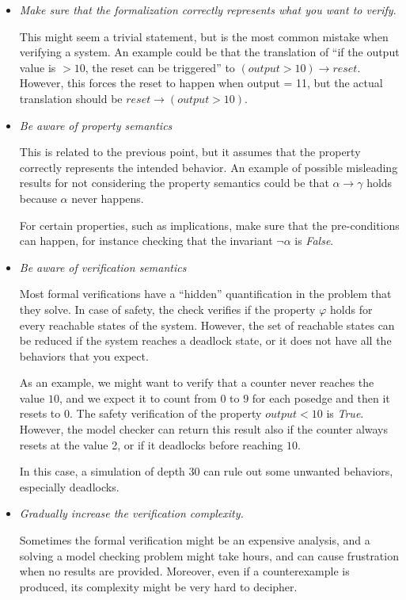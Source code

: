 \documentclass{article}
\theoremstyle{definition}
\begin{document}
\begin{itemize}
\item \textit{Make sure that the formalization correctly represents
  what you want to verify}.

  This might seem a trivial statement, but is the most common mistake
  when verifying a system. An example could be that the translation of
  ``if the output value is $> 10$, the reset can be triggered'' to
  $(output > 10) \rightarrow reset$. However, this forces the reset to
  happen when output = 11, but the actual translation should be $reset
  \rightarrow (output > 10)$.

\item \textit{Be aware of property semantics}

  This is related to the previous point, but it assumes that the
  property correctly represents the intended behavior. An example of
  possible misleading results for not considering the property
  semantics could be that $\alpha \rightarrow \gamma$ holds because
  $\alpha$ never happens.

  For certain properties, such as implications, make sure that the
  pre-conditions can happen, for instance checking that the invariant
  $\neg \alpha$ is \emph{False}.

\item \textit{Be aware of verification semantics}

  Most formal verifications have a ``hidden'' quantification in the
  problem that they solve. In case of safety, the check verifies if
  the property $\varphi$ holds for every reachable states of the
  system. However, the set of reachable states can be reduced if the
  system reaches a deadlock state, or it does not have all the
  behaviors that you expect.

  As an example, we might want to verify that a counter never reaches
  the value $10$, and we expect it to count from $0$ to $9$ for each
  posedge and then it resets to $0$. The safety verification of the
  property $output < 10$ is \emph{True}.  However, the model checker
  can return this result also if the counter always resets at the
  value 2, or if it deadlocks before reaching $10$.

  In this case, a simulation of depth $30$ can rule out some unwanted
  behaviors, especially deadlocks.

  
\item \textit{Gradually increase the verification complexity.}

  Sometimes the formal verification might be an expensive analysis,
  and a solving a model checking problem might take hours, and can
  cause frustration when no results are provided. Moreover, even if a
  counterexample is produced, its complexity might be very hard to
  decipher.


\end{itemize}
\end{document}
